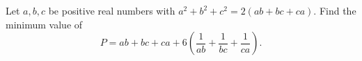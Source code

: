 Let $a,b,c$ be positive real numbers with $a^2+b^2+c^2=2(ab+bc+ca)$. Find the minimum value of
\[P=ab+bc+ca+6\left(\dfrac{1}{ab}+\dfrac{1}{bc}+\dfrac{1}{ca}\right).\]
